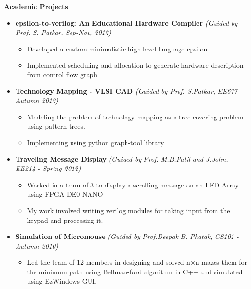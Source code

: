 \documentclass[a4paper,10pt]{article}
\newcommand{\isep}{-2 pt}
\newcommand{\resheading}[1]{{\small \colorbox{mygrey}{\begin{minipage}{0.975\textwidth}{\textbf{#1 \vphantom{p\^{E}}}}\end{minipage}}}}
\begin{document}
\resheading{\textbf{\large Academic Projects}}
\begin{itemize}
    \item \textbf{ epsilon-to-verilog: An Educational Hardware Compiler} \hfill \emph{(Guided by Prof. S. Patkar, Sep-Nov, 2012) }  \\[-0.6cm]
        \begin{itemize} \itemsep \isep
        \item Developed a custom minimalistic high level language epsilon 
        \item Implemented scheduling and allocation to generate hardware description from control flow graph
   \end{itemize}
\item \textbf{Technology Mapping - VLSI CAD} \hfill  \hfill \emph{(Guided by Prof. S.Patkar, EE677 - Autumn 2012)} \\[-0.6cm]
    \begin{itemize} 
        \item Modeling the problem of technology mapping as a tree covering problem using pattern trees. \\[-0.6cm]
        \item Implementing using python graph-tool library \\[-0.6cm]
    \end{itemize}
\item \textbf{Traveling Message Display} \hfill \emph{(Guided by Prof. M.B.Patil and J.John, EE214 - Spring 2012)}\\[-0.6cm]
    \begin{itemize}
        \item Worked in a team of 3 to display a scrolling message on an LED Array using FPGA DE0 NANO\\[-0.6cm]
        \item My work involved writing verilog modules for taking input from the keypad and processing it.\\[-0.6cm]
    \end{itemize}
\item \textbf{Simulation of Micromouse} \hfill \emph{(Guided by Prof.Deepak B. Phatak, CS101 - Autumn 2010)}\\[-0.7cm]
	\begin{itemize}
	    \item Led the team of 12 members in designing and solved n$\times$n mazes them for the minimum path using Bellman-ford algorithm in C++ and simulated using EzWindows GUI.\\[-0.6cm]

\end{itemize}
\end{itemize}
\end{document}
